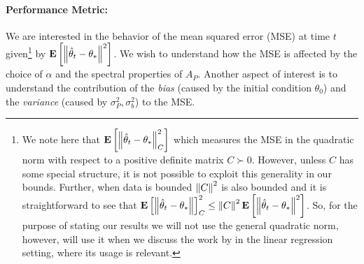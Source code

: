 \paragraph{Performance Metric:}  We are interested in the behavior of the mean squared error (MSE) at time $t$ given\footnote{ We note here that $\mathbf{E}\left[\left\| \hat{\theta}_t-\theta_*\right\|_C^2\right]$ which measures the MSE in the quadratic norm with respect to a positive definite matrix $C\succ 0$. However, unless $C$ has some special structure, it is not possible to exploit this generality in our bounds. Further, when data is bounded $\left\| C\right\|^2$ is also bounded and it is straightforward to see that $\mathbf{E}\left[\left\| \hat{\theta}_t-\theta_*\right\|\right]^2_C\leq \left\| C\right\|^2\mathbf{E}\left[\left\| \hat{\theta}_t-\theta_*\right\|^2\right]$. So, for the purpose of stating our results we will not use the general quadratic norm, however, will use it when we discuss the work by \cite{bach} in the linear regression setting, where its usage is relevant.} by $\mathbf{E}\left[\left\| \hat{\theta}_t-\theta_*\right\|^2\right]$. We wish to understand how the MSE is affected by the choice of $\alpha$ and the spectral properties of $A_P$. Another aspect of interest is to understand the contribution of the \emph{bias} (caused by the initial condition $\theta_0$) and the \emph{variance} (caused by $\sigma^2_P,\sigma^2_b$) to the MSE.\par

